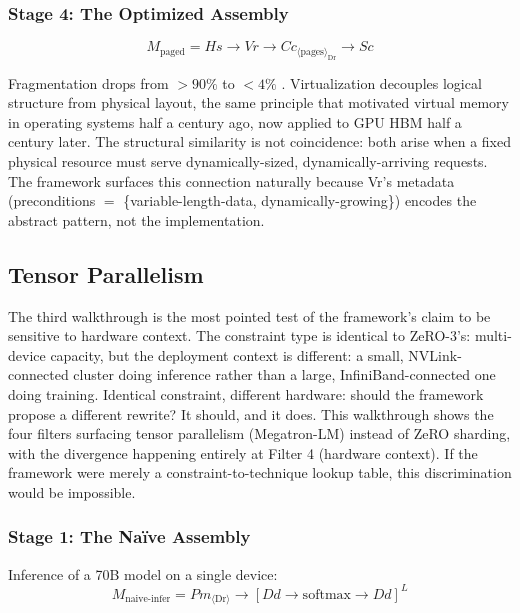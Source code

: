\documentclass[10pt,twocolumn]{article}
\begin{document}
\subsubsection{Stage 4: The Optimized Assembly}

\begin{equation*}
M_{\text{paged}} = Hs \rightarrow Vr \rightarrow Cc_{\langle \text{pages} \rangle_{\text{Dr}}} \rightarrow Sc
\end{equation*}

Fragmentation drops from $>90\%$ to $<4\%$ \citep{kwon2023}. Virtualization decouples logical structure from physical layout, the same principle that motivated virtual memory in operating systems half a century ago, now applied to GPU HBM half a century later. The structural similarity is not coincidence: both arise when a fixed physical resource must serve dynamically-sized, dynamically-arriving requests. The framework surfaces this connection naturally because Vr's metadata (preconditions $=$ \{variable-length-data, dynamically-growing\}) encodes the abstract pattern, not the implementation.

\subsection{Tensor Parallelism}
\label{sec:tensor-parallel}

The third walkthrough is the most pointed test of the framework's claim to be sensitive to hardware context. The constraint type is identical to ZeRO-3's: multi-device capacity, but the deployment context is different: a small, NVLink-connected cluster doing inference rather than a large, InfiniBand-connected one doing training. Identical constraint, different hardware: should the framework propose a different rewrite? It should, and it does. This walkthrough shows the four filters surfacing tensor parallelism (Megatron-LM) instead of ZeRO sharding, with the divergence happening entirely at Filter 4 (hardware context). If the framework were merely a constraint-to-technique lookup table, this discrimination would be impossible.

\subsubsection{Stage 1: The Na\"ive Assembly}

Inference of a 70B model on a single device:
\begin{equation*}
M_{\text{naive-infer}} = Pm_{\langle \text{Dr} \rangle} \rightarrow [Dd \rightarrow \mathrm{softmax} \rightarrow Dd]^{L}
\end{equation*}
\end{document}
